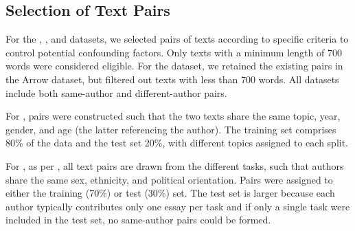 \subsection{Selection of Text Pairs}
\label{subsec:dataset_text_pair_selection}

For the \dataBlog{}, \dataStudent{}, and \dataGutenberg{} datasets, we selected pairs of texts according to specific criteria to control potential confounding factors.
Only texts with a minimum length of \num{700} words were considered eligible. 
For the \dataPan{} dataset, we retained the existing pairs in the Arrow dataset, but filtered out texts with less than 700 words. 
All datasets include both same-author and different-author pairs. 

For \dataBlog{}, pairs were constructed such that the two texts share the same topic, year, gender, and age (the latter referencing the author). 
The training set comprises 80\% of the data and the test set 20\%, with different topics assigned to each split.

For \dataStudent{}, as per \citep{koppel_determining_2014}, all text pairs are drawn from the different tasks, such that authors share the same sex, ethnicity, and political orientation. 
Pairs were assigned to either the training (70\%) or test (30\%) set. 
The test set is larger because each author typically contributes only one essay per task and if only a single task were included in the test set, no same-author pairs could be formed. 



